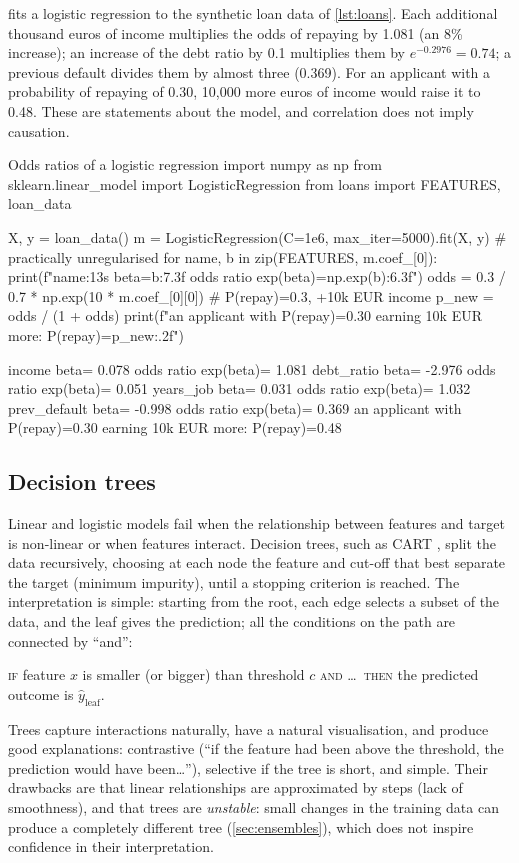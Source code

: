  fits a logistic regression to the synthetic loan data of \cref{lst:loans}. Each
additional thousand euros of income multiplies the odds of repaying by 1.081 (an 8\% increase);
an increase of the debt ratio by 0.1 multiplies them by $e^{-0.2976}=0.74$; a previous default
divides them by almost three (0.369). For an applicant with a probability of repaying of 0.30,
10,000 more euros of income would raise it to 0.48. These are statements about the
model, and correlation does not imply causation.

\begin{pylisting}[label={lst:odds}]{Odds ratios of a logistic regression}
import numpy as np
from sklearn.linear_model import LogisticRegression
from loans import FEATURES, loan_data

X, y = loan_data()
m = LogisticRegression(C=1e6, max_iter=5000).fit(X, y)      # practically unregularised
for name, b in zip(FEATURES, m.coef_[0]):
    print(f"{name:13s} beta={b:7.3f}   odds ratio exp(beta)={np.exp(b):6.3f}")
odds = 0.3 / 0.7 * np.exp(10 * m.coef_[0][0])               # P(repay)=0.3, +10k EUR income
p_new = odds / (1 + odds)
print(f"an applicant with P(repay)=0.30 earning 10k EUR more: P(repay)={p_new:.2f}")
\end{pylisting}
\begin{pyoutput}
income        beta=  0.078   odds ratio exp(beta)= 1.081
debt_ratio    beta= -2.976   odds ratio exp(beta)= 0.051
years_job     beta=  0.031   odds ratio exp(beta)= 1.032
prev_default  beta= -0.998   odds ratio exp(beta)= 0.369
an applicant with P(repay)=0.30 earning 10k EUR more: P(repay)=0.48
\end{pyoutput}

\subsection{Decision trees}

Linear and logistic models fail when the relationship between features and target is non-linear or
when features interact. Decision trees, such as CART \citep{breiman1984classification}, split the data
recursively, choosing at each node the feature and cut-off that best separate the target (minimum
impurity), until a stopping criterion is reached. The interpretation is simple: starting from the
root, each edge selects a subset of the data, and the leaf gives the prediction; all the conditions
on the path are connected by ``and'':
\begin{center}
\textsc{if} feature $x$ is smaller (or bigger) than threshold $c$ \textsc{and} \dots\ \textsc{then}
the predicted outcome is $\hat y_{\text{leaf}}$.
\end{center}
Trees capture interactions naturally, have a natural visualisation, and produce good explanations:
contrastive (``if the feature had been above the threshold, the prediction would have been\dots''),
selective if the tree is short, and simple. Their drawbacks are that linear relationships are
approximated by steps (lack of smoothness), and that trees are \emph{unstable}: small changes in the
training data can produce a completely different tree (\cref{sec:ensembles}), which does not inspire
confidence in their interpretation.

